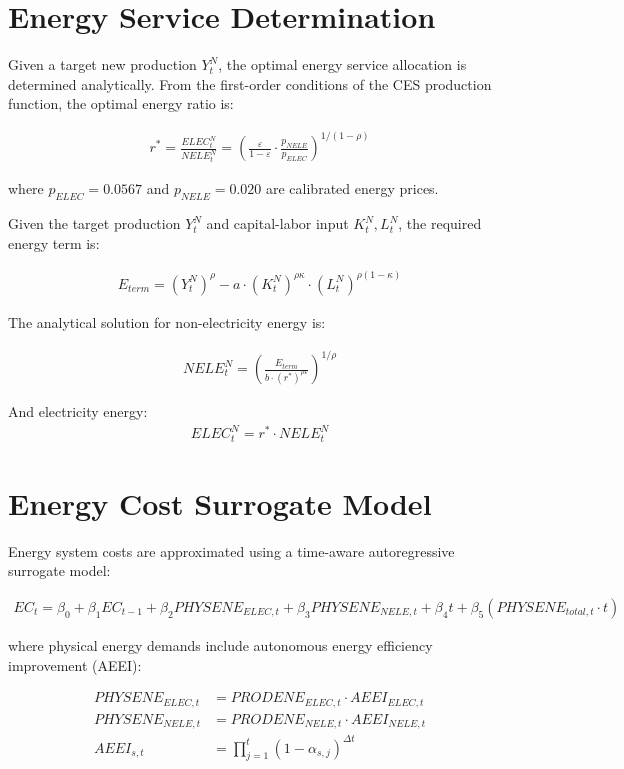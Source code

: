 \documentclass{article}
\begin{document}
\section{Energy Service Determination}

Given a target new production $Y_t^N$, the optimal energy service allocation is determined analytically. From the first-order conditions of the CES production function, the optimal energy ratio is:

\begin{align}
r^* = \frac{ELEC_t^N}{NELE_t^N} = \left(\frac{\varepsilon}{1-\varepsilon} \cdot \frac{p_{NELE}}{p_{ELEC}}\right)^{1/(1-\rho)}
\end{align}

where $p_{ELEC} = 0.0567$ and $p_{NELE} = 0.020$ are calibrated energy prices.

Given the target production $Y_t^N$ and capital-labor input $K_t^N, L_t^N$, the required energy term is:

\begin{align}
E_{term} = (Y_t^N)^\rho - a \cdot (K_t^N)^{\rho \kappa} \cdot (L_t^N)^{\rho(1-\kappa)}
\end{align}

The analytical solution for non-electricity energy is:

\begin{align}
NELE_t^N = \left(\frac{E_{term}}{b \cdot (r^*)^{\rho \varepsilon}}\right)^{1/\rho}
\end{align}

And electricity energy:
\begin{align}
ELEC_t^N = r^* \cdot NELE_t^N
\end{align}

\section{Energy Cost Surrogate Model}

Energy system costs are approximated using a time-aware autoregressive surrogate model:

\begin{align}
EC_t = \beta_0 + \beta_1 EC_{t-1} + \beta_2 PHYSENE_{ELEC,t} + \beta_3 PHYSENE_{NELE,t} + \beta_4 t + \beta_5 (PHYSENE_{total,t} \cdot t)
\end{align}

where physical energy demands include autonomous energy efficiency improvement (AEEI):

\begin{align}
PHYSENE_{ELEC,t} &= PRODENE_{ELEC,t} \cdot AEEI_{ELEC,t} \\
PHYSENE_{NELE,t} &= PRODENE_{NELE,t} \cdot AEEI_{NELE,t} \\
AEEI_{s,t} &= \prod_{j=1}^{t} (1 - \alpha_{s,j})^{\Delta t}
\end{align}
\end{document}
